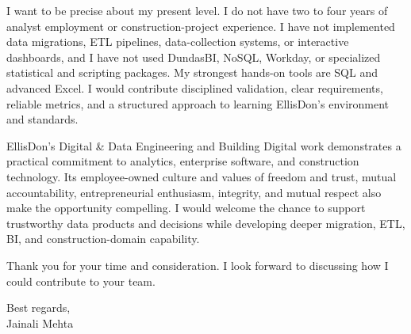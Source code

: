\documentclass[letterpaper,10pt]{article}
\begin{document}
I want to be precise about my present level. I do not have two to four years of analyst employment or construction-project experience. I have not implemented data migrations, ETL pipelines, data-collection systems, or interactive dashboards, and I have not used DundasBI, NoSQL, Workday, or specialized statistical and scripting packages. My strongest hands-on tools are SQL and advanced Excel. I would contribute disciplined validation, clear requirements, reliable metrics, and a structured approach to learning EllisDon's environment and standards.

EllisDon's Digital \& Data Engineering and Building Digital work demonstrates a practical commitment to analytics, enterprise software, and construction technology. Its employee-owned culture and values of freedom and trust, mutual accountability, entrepreneurial enthusiasm, integrity, and mutual respect also make the opportunity compelling. I would welcome the chance to support trustworthy data products and decisions while developing deeper migration, ETL, BI, and construction-domain capability.

Thank you for your time and consideration. I look forward to discussing how I could contribute to your team.

Best regards,\\[8pt]
Jainali Mehta
\end{document}
